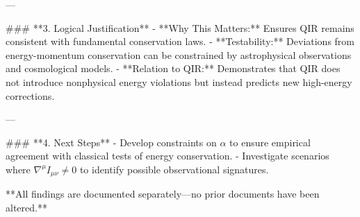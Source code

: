 ---

### **3. Logical Justification**
- **Why This Matters:** Ensures QIR remains consistent with fundamental conservation laws.
- **Testability:** Deviations from energy-momentum conservation can be constrained by astrophysical observations and cosmological models.
- **Relation to QIR:** Demonstrates that QIR does not introduce nonphysical energy violations but instead predicts new high-energy corrections.

---

### **4. Next Steps**
- Develop constraints on \( \alpha \) to ensure empirical agreement with classical tests of energy conservation.
- Investigate scenarios where \( \nabla^\mu I_{\mu \nu} \neq 0 \) to identify possible observational signatures.

**All findings are documented separately—no prior documents have been altered.**

